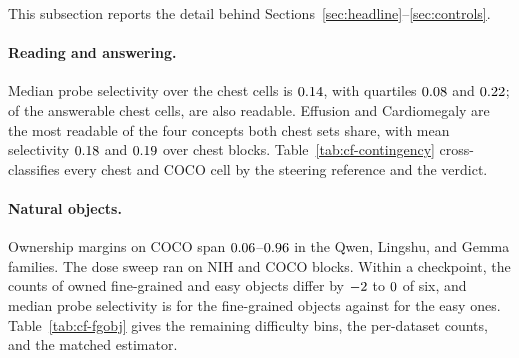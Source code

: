 \documentclass{article}
\begin{document}
This subsection reports the detail behind Sections~\ref{sec:headline}--\ref{sec:controls}.

\paragraph{Reading and answering.} Median probe selectivity over the chest cells is $0.14$, with quartiles $0.08$ and $0.22$; of the \cfChestAnswerable{} answerable chest cells, \cfReadAns{} are also readable. Effusion and Cardiomegaly are the most readable of the four concepts both chest sets share, with mean selectivity $0.18$ and $0.19$ over \cfChestProbeBlocks{} chest blocks. Table~\ref{tab:cf-contingency} cross-classifies every chest and COCO cell by the steering reference and the verdict.

\paragraph{Natural objects.} Ownership margins on COCO span $0.06$--$0.96$ in the Qwen, Lingshu, and Gemma families. The dose sweep ran on \cfDoseBlocksNih{} NIH and \cfDoseBlocksCoco{} COCO blocks. Within a checkpoint, the counts of owned fine-grained and easy objects differ by $-2$ to $0$ of six, and median probe selectivity is \cfFgFineSel{} for the fine-grained objects against \cfFgEasySameSel{} for the easy ones. Table~\ref{tab:cf-fgobj} gives the remaining difficulty bins, the per-dataset counts, and the matched estimator.
\end{document}

